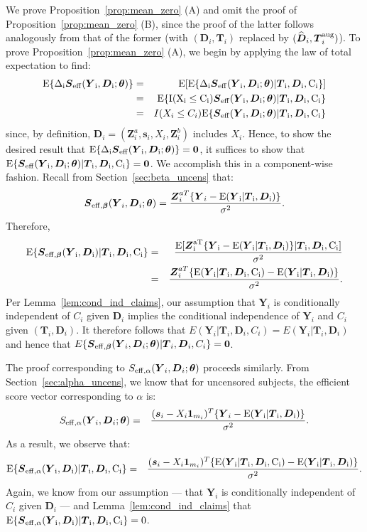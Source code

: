 \documentclass[12pt]{article}
\def\bse{\begin{eqnarray*}}
\def\ese{\end{eqnarray*}}
\def\bse{\begin{eqnarray*}}
\def\ese{\end{eqnarray*}}
\def\bS{{\mathbf S}}
\def\bzero{{\mathbf 0}}
\def\bbeta{{\boldsymbol{\beta}}}
\def\btheta{{\boldsymbol{\theta}}}
\def\bzero{{\boldsymbol{0}}}
\def\bone{{\boldsymbol{1}}}
\def\bs{{\boldsymbol s}}
\def\bD{{\boldsymbol D}}
\def\bS{{\boldsymbol S}}
\def\bT{{\boldsymbol T}}
\def\bY{{\boldsymbol Y}}
\def\bZ{{\boldsymbol Z}}
\def\tilD{\bD}
\def\E{\rm E}
\begin{document}
We prove Proposition~\ref{prop:mean_zero} (A) and omit the proof of Proposition~\ref{prop:mean_zero} (B), since the proof of the latter follows analogously from that of the former (with $(\tilD_i, \bT_i)$ replaced by $(\widehat{\tilD}_i, \bT_i^{\rm aug})$). 
To prove Proposition~\ref{prop:mean_zero} (A), we begin by applying the law of total expectation to find:
\bse
\E\{\Delta_i\bS_{\rm{eff}}(\bY_i,\tilD_i;\btheta)\}&=&\E[\E\{\Delta_i\bS_{\rm{eff}}(\bY_i,\tilD_i;\btheta)|\bT_i,\tilD_i,C_i\}]\\
&=&\E\{I(X_i \leq C_i)\bS_{\rm{eff}}(\bY_i,\tilD_i;\btheta)|\bT_i,\tilD_i,C_i\}
\\
&=&I(X_i \leq C_i)\E\{\bS_{\rm{eff}}(\bY_i,\tilD_i;\btheta)|\bT_i,\tilD_i,C_i\}
\ese
since, by definition, $\tilD_i=(\bZ^a_i, \bs_i, X_i, \bZ^b_i)$ includes $X_i$. Hence, to show the desired result that $\E\{\Delta_i\bS_{\rm{eff}}(\bY_i,\tilD_i;\btheta)\} = \bzero$, it suffices to show that $\E\{\bS_{\rm{eff}}(\bY_i,\tilD_i;\btheta)|\bT_i,\tilD_i,C_i\}=\bzero$. We accomplish this in a component-wise fashion. Recall from Section~\ref{sec:beta_uncens} that:
\bse
\bS_{\rm{eff},\bbeta}(\bY_i,\tilD_i;\btheta)
=\frac{\bZ^{aT}_i\{\bY_i-\E(\bY_i|\bT_i,\tilD_i)\}}{\sigma^2}.
\ese
Therefore,
\bse
\E\{\bS_{\rm{eff,\bbeta}}(\bY_i,\tilD_i)|\bT_i,\tilD_i,C_i\}&=&\frac{\E[\bZ^{aT}_i\{\bY_i-\E(\bY_i|\bT_i,\tilD_i)\}|\bT_i,\tilD_i,C_i]}{\sigma^2}\\
&=&\frac{\bZ^{aT}_i\{\E(\bY_i|\bT_i,\tilD_i,C_i)-\E(\bY_i|\bT_i,\tilD_i)\}}{\sigma^2}.
\ese
Per Lemma~\ref{lem:cond_ind_claims}, our assumption that $\bY_i$ is conditionally independent of $C_i$ given $\tilD_i$ implies the conditional independence of $\bY_i$ and $C_i$ given $(\bT_i,\tilD_i)$. It therefore follows that $E(\bY_i|\bT_i,\tilD_i,C_i)=E(\bY_i|\bT_i,\tilD_i)$ and hence that $E\{\bS_{\rm{eff},\bbeta}(\bY_i,\tilD_i;\btheta)|\bT_i,\tilD_i,C_i\}=\bzero$.

The proof corresponding to $S_{\rm{eff},\alpha}(\bY_i,\tilD_i;\btheta)$ proceeds similarly. From Section~\ref{sec:alpha_uncens}, we know that for uncensored subjects, the efficient score vector corresponding to $\alpha$ is:
\bse
S_{\rm{eff},\alpha}(\bY_i,\tilD_i;\btheta)&=&\frac{(\bs_i-X_i\bone_{m_i})^T\{\bY_i-\E(\bY_i|\bT_i,\tilD_i)\}}{\sigma^2}.
\ese
As a result, we observe that:
\bse
\E\{\bS_{\rm{eff,\alpha}}(\bY_i,\tilD_i)|\bT_i,\tilD_i,C_i\}&=&\frac{(\bs_i-X_i\bone_{m_i})^T\{\E(\bY_i|\bT_i,\tilD_i,C_i)-\E(\bY_i|\bT_i,\tilD_i)\}}{\sigma^2}.
\ese
Again, we know from our assumption --- that $\bY_i$ is conditionally independent of $C_i$ given $\tilD_i$ --- and Lemma~\ref{lem:cond_ind_claims} that $\E\{\bS_{\rm{eff,\alpha}}(\bY_i,\tilD_i)|\bT_i,\tilD_i,C_i\}=0$.
\end{document}
